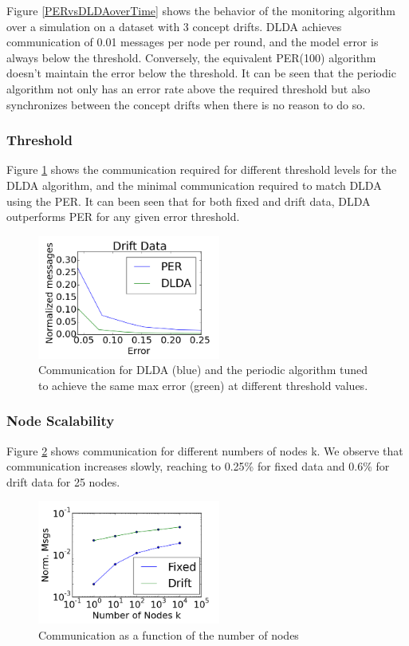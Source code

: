 \documentclass{sig-alternate-05-2015}
\begin{document}
Figure \ref{PERvsDLDAoverTime} shows the behavior of the monitoring 
algorithm over a simulation on a dataset with 3 concept drifts. 
DLDA achieves communication of 0.01 messages per node per round, and 
the model error is always below the threshold. 
Conversely, the equivalent PER(100) algorithm doesn't maintain the
error below the threshold. 
It can be seen that the periodic algorithm 
not only has an error rate above the required threshold but also
synchronizes between the concept drifts when there is no reason to do so.
\subsubsection{Threshold}
Figure \ref{PERvsDLDAoverError} shows the communication required for different
threshold levels for the DLDA algorithm, and the minimal
communication required to match DLDA using the PER.	
It can been seen that for both fixed and drift data, DLDA outperforms PER for
any given error threshold.
 \begin{figure}[ht]
	\centering
	\includegraphics[width=60mm]{PER/onlyDrift.png}
	\caption{Communication for DLDA (blue) and the
	periodic algorithm tuned to achieve the same max error
	(green) at different threshold values.}
	\label{PERvsDLDAoverError}
	\end{figure}

	
\subsubsection{Node Scalability}
Figure \ref{Nodes} shows communication for different numbers of nodes k. 
We observe that communication increases slowly, reaching to 0.25\% for fixed
data and 0.6\% for drift data for 25 nodes.
	\begin{figure}[h]
	\centering
	\includegraphics[width=60mm]{CommunicationOfFixedVsDrift/Nodes.png}
	\caption{Communication as a function of the number of nodes}
	\label{Nodes}
	\end{figure}
\end{document}
